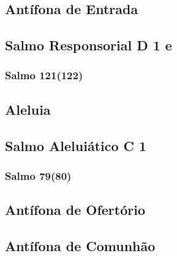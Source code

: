 \subsection{Antífona de Entrada}\label{subsection:tempus-adventus/missa-2/introitus}

\subsection[Salmo Responsorial]{Salmo Responsorial \textmd{D 1 e}}\label{subsection:tempus-adventus/missa-2/psalmus-responsorius}
\subsubsection{Salmo 121(122)}

\AllowPageFlush

\subsection{Aleluia}\label{subsection:tempus-adventus/missa-2/alleluia}

\AllowPageFlush

\subsection[Salmo Aleluiático]{Salmo Aleluiático \textmd{C 1}}\label{subsection:tempus-adventus/missa-2/psalmus-alleluiaticus}
\subsubsection{Salmo 79(80)}

\AllowPageFlush

\subsection{Antífona de Ofertório}\label{subsection:tempus-adventus/missa-2/offertorium}

\AllowPageFlush

\subsection{Antífona de Comunhão}\label{subsection:tempus-adventus/missa-2/communio}
